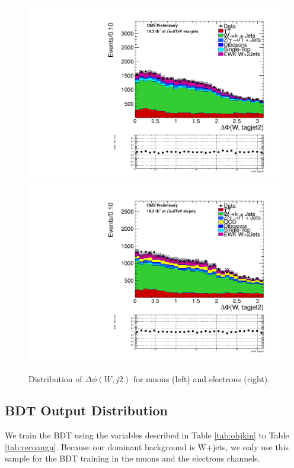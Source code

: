 \begin{figure}[ht]
\centerline{
\includegraphics[width=.49\textwidth]{figs/n-1_plots_mu/mu_EWK_W_2jets_W_tagjet2_deltaphi_mjj_600_tagjet1_60_tagjet2_50_Zeppenfield_1point2_EWKW2jets.pdf}
\includegraphics[width=.49\textwidth]{figs/n-1_plots_el/el_EWK_W_2jets_W_tagjet2_deltaphi_mjj_600_tagjet1_60_tagjet2_50_Zeppenfield_1point2_met_30_WmT_30_EWKW2jets.pdf}
}
\caption{Distribution of $\Delta \phi(W,j2)$ for muons (left) and electrons (right).}
\label{fig:deltaphiwj2}
\end{figure}


\clearpage

\subsection{BDT Output Distribution}
We train the BDT using the variables described in Table \ref{tab:objkin} to Table \ref{tab:recoangu}. Because our dominant background is W+jets, we only use this sample for the BDT training in the muons and the electrons channels. 

